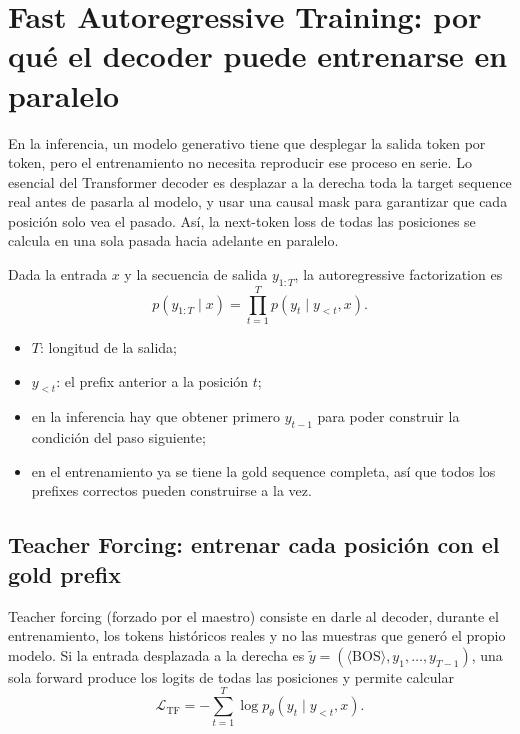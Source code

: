 \section{Fast Autoregressive Training: por qué el decoder puede entrenarse en paralelo}

En la inferencia, un modelo generativo tiene que desplegar la salida token por token, pero el entrenamiento no necesita reproducir ese proceso en serie. Lo esencial del Transformer decoder es desplazar a la derecha toda la target sequence real antes de pasarla al modelo, y usar una causal mask para garantizar que cada posición solo vea el pasado. Así, la next-token loss de todas las posiciones se calcula en una sola pasada hacia adelante en paralelo.


Dada la entrada $x$ y la secuencia de salida $y_{1:T}$, la autoregressive factorization es
\[
p(y_{1:T}\mid x)=\prod_{t=1}^{T}p(y_t\mid y_{<t},x).
\]

\begin{itemize}
  \item $T$: longitud de la salida;
  \item $y_{<t}$: el prefix anterior a la posición $t$;
  \item en la inferencia hay que obtener primero $y_{t-1}$ para poder construir la condición del paso siguiente;
  \item en el entrenamiento ya se tiene la gold sequence completa, así que todos los prefixes correctos pueden construirse a la vez.
\end{itemize}


\subsection{Teacher Forcing: entrenar cada posición con el gold prefix}

Teacher forcing (forzado por el maestro) consiste en darle al decoder, durante el entrenamiento, los tokens históricos reales y no las muestras que generó el propio modelo. Si la entrada desplazada a la derecha es $\tilde y=(\langle\mathrm{BOS}\rangle,y_1,\ldots,y_{T-1})$, una sola forward produce los logits de todas las posiciones y permite calcular
\[
\mathcal{L}_{\mathrm{TF}}
=-\sum_{t=1}^{T}\log p_{\theta}(y_t\mid y_{<t},x).
\]

